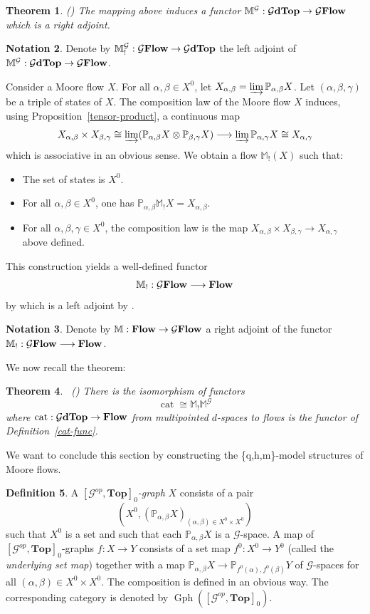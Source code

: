 \documentclass[a4paper,12pt]{amsart}
\newcommand{\p}{\times}
\renewcommand{\P}{\mathbb{P}}
\newtheorem{thm}{Theorem}[section]
\newcommand{\bth}{\begin{thm}}
\renewcommand{\eth}{\end{thm}}
\theoremstyle{definition}
\newtheorem{defn}[thm]{Definition}
\newcommand{\bd}{\begin{defn}}
\newcommand{\ed}{\end{defn}}
\newtheorem{nota}[thm]{Notation}
\renewcommand{\top}{{\mathbf{Top}}}
\newcommand{\iso}{\cong}
\newcommand{\ot}{\otimes}
\newcommand{\ptop}[1]{{\brm{{#1}dTop}}}
\newcommand{\moore}{{\mathbb{M}}}
\newcommand{\lmoore}{\mathbb{M}_!}
\newcommand{\brm}[1]{{\rm{\mathbf{#1}}}}
\newcommand{\dtop}{{\brm{Flow}}}
\newcommand{\dtopG}{{\mathcal{G}\brm{Flow}}}
\newcommand{\topdgr}{[\mathcal{G}^{op},\top]}
\DeclareMathOperator{\Cat}{\mathrm{cat}}
\newcommand{\liminj}{\varinjlim}
\renewcommand{\P}{\mathbb{P}}
\DeclareMathOperator{\pf}{{Gph}}
\begin{document}
\bth \label{MG} (\cite[Theorem~4.12 and Appendix~B]{Moore2})
The mapping above induces a functor $\moore^{\mathcal{G}}:\ptop{\mathcal{G}}\to\dtopG$ which is a right adjoint.
\eth

\begin{nota}
	Denote by $\lmoore^{\mathcal{G}}:\dtopG\to\ptop{\mathcal{G}}$ the left adjoint of $\moore^{\mathcal{G}}:\ptop{\mathcal{G}}\to \dtopG$. 
\end{nota}

Consider a Moore flow $X$. For all $\alpha,\beta\in X^0$, let $X_{\alpha,\beta}=\liminj \P_{\alpha,\beta}X$. Let $(\alpha,\beta,\gamma)$ be a triple of states of $X$. The composition law of the Moore flow $X$ induces, using Proposition~\ref{tensor-product}, a continuous map \[X_{\alpha,\beta} \p X_{\beta,\gamma} \iso \liminj(\P_{\alpha,\beta}X \ot \P_{\beta,\gamma}X) \longrightarrow \liminj \P_{\alpha,\gamma}X \iso X_{\alpha,\gamma}\] which is associative in an obvious sense. We obtain a flow $\lmoore(X)$ such that:
\begin{itemize}
	\item  The set of states is $X^0$.
	\item For all $\alpha,\beta\in X^0$, one has  $\P_{\alpha,\beta}\lmoore X=X_{\alpha,\beta}$.
	\item For all $\alpha,\beta,\gamma\in X^0$, the composition law is the map $X_{\alpha,\beta}\p X_{\beta,\gamma}\to X_{\alpha,\gamma}$ above defined.
\end{itemize}
This construction yields a well-defined functor \[\lmoore:\dtopG \longrightarrow \dtop\] by \cite[Proposition~10.5]{Moore1} which is a left adjoint by \cite[Theorem~10.7]{Moore1}. 

\begin{nota}
	Denote by $\moore:\dtop\to \dtopG$ a right adjoint of the functor $\lmoore:\dtopG \longrightarrow \dtop$.
\end{nota}


We now recall the theorem:

\bth \label{decomposing2} (\cite[Theorem~8.11]{Moore2}) There is the isomorphism of functors \[\Cat\iso\lmoore\moore^{\mathcal{G}}\] 
where $\Cat:\ptop{\mathcal{G}}\to \dtop$ from multipointed $d$-spaces to flows is the functor of Definition~\ref{cat-func}. \eth

We want to conclude this section by constructing the \{q,h,m\}-model structures of Moore flows. 


\bd A \textit{$\topdgr_0$-graph} $X$ consists of a pair \[(X^0,(\P_{\alpha,\beta}X)_{(\alpha,\beta)\in X^0\p X^0})\] such that $X^0$ is a set and such that each $\P_{\alpha,\beta}X$ is a $\mathcal{G}$-space. A map of $\topdgr_0$-graphs $f:X\to Y$ consists of a set map $f^0:X^0\to Y^0$ (called the \textit{underlying set map}) together with a map $\P_{\alpha,\beta}X\to \P_{f^0(\alpha),f^0(\beta)}Y$ of $\mathcal{G}$-spaces for all $(\alpha,\beta)\in X^0\p X^0$. The composition is defined in an obvious way. The corresponding category is denoted by $\pf(\topdgr_0)$. 
\ed
\end{document}
